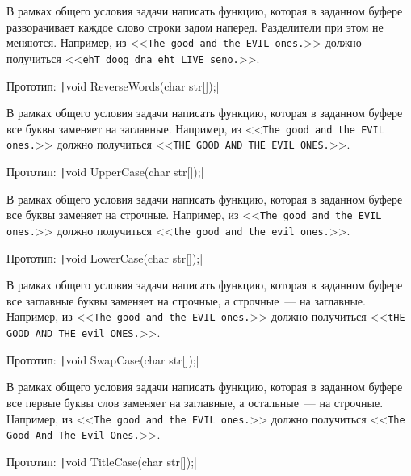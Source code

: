 \begin{zztask}
В рамках общего условия задачи написать функцию, которая в заданном буфере
разворачивает каждое слово строки задом наперед. Разделители при этом не
меняются.
Например, из
<<\texttt{The good and the EVIL ones.}>>
должно получиться
<<\texttt{ehT doog dna eht LIVE seno.}>>.

Прототип: \texttt|void ReverseWords(char str[]);|
\end{zztask}


\begin{zztask}
В рамках общего условия задачи написать функцию, которая в заданном буфере
все буквы заменяет на заглавные.
Например, из
<<\texttt{The good and the EVIL ones.}>>
должно получиться
<<\texttt{THE GOOD AND THE EVIL ONES.}>>.

Прототип: \texttt|void UpperCase(char str[]);|
\end{zztask}


\begin{zztask}
В рамках общего условия задачи написать функцию, которая в заданном буфере
все буквы заменяет на строчные.
Например, из
<<\texttt{The good and the EVIL ones.}>>
должно получиться
<<\texttt{the good and the evil ones.}>>.

Прототип: \texttt|void LowerCase(char str[]);|
\end{zztask}


\begin{zztask}
В рамках общего условия задачи написать функцию, которая в заданном буфере
все заглавные буквы заменяет на строчные, а строчные~--- на заглавные.
Например, из
<<\texttt{The good and the EVIL ones.}>>
должно получиться
<<\texttt{tHE GOOD AND THE evil ONES.}>>.

Прототип: \texttt|void SwapCase(char str[]);|
\end{zztask}


\begin{zztask}
В рамках общего условия задачи написать функцию, которая в заданном буфере
все первые буквы слов заменяет на заглавные, а остальные~--- на строчные.
Например, из
<<\texttt{The good and the EVIL ones.}>>
должно получиться
<<\texttt{The Good And The Evil Ones.}>>.

Прототип: \texttt|void TitleCase(char str[]);|
\end{zztask}

